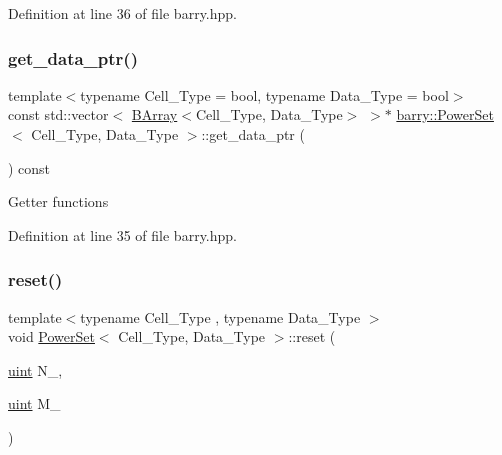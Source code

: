 Definition at line 36 of file barry.\+hpp.

\mbox{\label{classbarry_1_1_power_set_ab909404d85f177a3cd0b8cca1eaf4efd}} 
\subsubsection{\texorpdfstring{get\+\_\+data\+\_\+ptr()}{get\_data\_ptr()}}
{\footnotesize\ttfamily template$<$typename Cell\+\_\+\+Type  = bool, typename Data\+\_\+\+Type  = bool$>$ \\
const std\+::vector$<$ \hyperlink{classbarry_1_1_b_array}{B\+Array}$<$Cell\+\_\+\+Type, Data\+\_\+\+Type$>$ $>$$\ast$ \hyperlink{classbarry_1_1_power_set}{barry\+::\+Power\+Set}$<$ Cell\+\_\+\+Type, Data\+\_\+\+Type $>$\+::get\+\_\+data\+\_\+ptr (\begin{DoxyParamCaption}{ }\end{DoxyParamCaption}) const\hspace{0.3cm}{\ttfamily [inline]}}

Getter functions 

Definition at line 35 of file barry.\+hpp.

\mbox{\label{classbarry_1_1_power_set_a8074f5a6d44b6b7f6bad56d15576eb9f}} 
\subsubsection{\texorpdfstring{reset()}{reset()}}
{\footnotesize\ttfamily template$<$typename Cell\+\_\+\+Type , typename Data\+\_\+\+Type $>$ \\
void \hyperlink{classbarry_1_1_power_set}{Power\+Set}$<$ Cell\+\_\+\+Type, Data\+\_\+\+Type $>$\+::reset (\begin{DoxyParamCaption}\item[{\hyperlink{namespacebarry_a11dfc53ddb4672278319aa04f1e09a6c}{uint}}]{N\+\_\+,  }\item[{\hyperlink{namespacebarry_a11dfc53ddb4672278319aa04f1e09a6c}{uint}}]{M\+\_\+ }\end{DoxyParamCaption})\hspace{0.3cm}{\ttfamily [inline]}}



